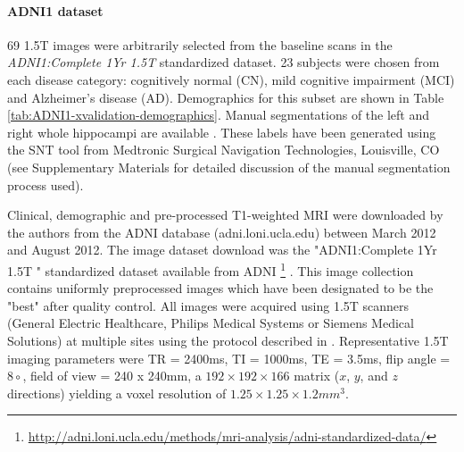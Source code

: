 \documentclass{article}\usepackage{graphicx, color}
\newcommand{\adnidataset}{ADNI1:Complete 1Yr 1.5T }
\begin{document}
\paragraph{ADNI1 dataset} 

69 1.5T images were arbitrarily selected from the baseline scans in the {\em
\adnidataset} standardized dataset. 23 subjects were chosen from each disease
category: cognitively normal (CN), mild cognitive impairment (MCI) and
Alzheimer's disease (AD). Demographics for this subset are shown in Table
\ref{tab:ADNI1-xvalidation-demographics}.  Manual segmentations of the left and
right whole hippocampi are available \citep{Hsu2002}. These labels have been
generated using the SNT tool from Medtronic Surgical Navigation Technologies,
Louisville, CO (see Supplementary Materials for detailed discussion of the
manual segmentation process used).

Clinical, demographic and pre-processed T1-weighted MRI were downloaded by the
authors from the ADNI database (adni.loni.ucla.edu) between March 2012 and
August 2012. The image dataset download was the "\adnidataset"
standardized dataset available from ADNI \footnote{
\url{http://adni.loni.ucla.edu/methods/mri-analysis/adni-standardized-data/}}
\citep{Wyman2012}. This image collection contains uniformly preprocessed images
which have been designated to be the "best" after quality control.  All images
were acquired using 1.5T scanners (General Electric Healthcare, Philips Medical
Systems or Siemens Medical Solutions) at multiple sites using the protocol
described in \citep{Jack2008}.  Representative 1.5T imaging parameters were TR
= 2400ms, TI = 1000ms, TE = 3.5ms, flip angle = $8{\circ}$, field of view = 240
x 240mm, a $192 \times 192 \times 166$ matrix ($x$, $y$, and $z$ directions)
yielding a voxel resolution of $1.25 \times 1.25 \times 1.2mm^3$.
\end{document}
